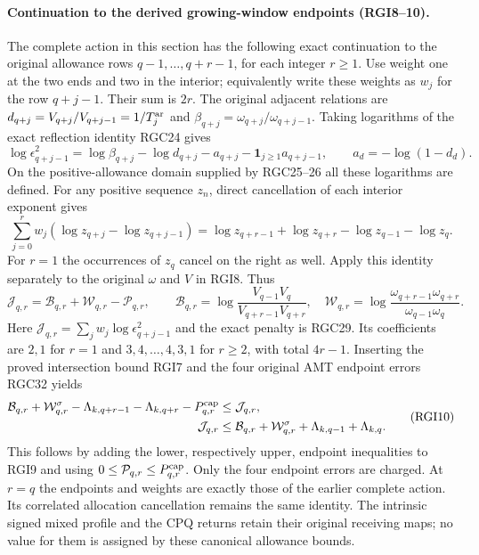 \paragraph{Continuation to the derived growing-window endpoints (RGI8--10).}
The complete action in this section has the following exact continuation to
the original allowance rows $q-1,\ldots,q+r-1$, for each integer $r\ge1$.
Use weight one at the two ends and two in the interior; equivalently write
these weights as $w_j$ for the row $q+j-1$.  Their sum is $2r$.  The original
adjacent relations are
$d_{q+j}=V_{q+j}/V_{q+j-1}=1/T_j^{\rm ar}$ and
$\beta_{q+j}=\omega_{q+j}/\omega_{q+j-1}$.  Taking logarithms of the exact
reflection identity RGC24 gives
\begin{equation}
 \log\epsilon_{q+j-1}^2
 =\log\beta_{q+j}-\log d_{q+j}-a_{q+j}
       -\boldsymbol1_{j\ge1}a_{q+j-1},\qquad
 a_d=-\log(1-d_d).
 \tag{RGI8}\label{RGI:rowaction}
\end{equation}
On the positive-allowance domain supplied by RGC25--26 all these logarithms
are defined.  For any positive sequence $z_n$, direct cancellation of each
interior exponent gives
\[
 \sum_{j=0}^{r}w_j(\log z_{q+j}-\log z_{q+j-1})
 =\log z_{q+r-1}+\log z_{q+r}-\log z_{q-1}-\log z_q.
\]
For $r=1$ the occurrences of $z_q$ cancel on the right as well.  Apply this
identity separately to the original $\omega$ and $V$ in RGI8.  Thus
\begin{equation}
 \mathcal J_{q,r}=\mathcal B_{q,r}+\mathcal W_{q,r}-\mathcal P_{q,r},
 \qquad
 \mathcal B_{q,r}=\log\frac{V_{q-1}V_q}{V_{q+r-1}V_{q+r}},\quad
 \mathcal W_{q,r}=\log\frac{\omega_{q+r-1}\omega_{q+r}}
                              {\omega_{q-1}\omega_q}.
 \tag{RGI9}\label{RGI:action}
\end{equation}
Here $\mathcal J_{q,r}=\sum_jw_j\log\epsilon_{q+j-1}^2$ and the exact penalty
is RGC29.  Its coefficients are $2,1$ for $r=1$ and
$3,4,\ldots,4,3,1$ for $r\ge2$, with total $4r-1$.
Inserting the proved intersection bound RGI7 and the four original AMT
endpoint errors RGC32 yields
\begin{equation}
 \begin{split}
 \mathcal B_{q,r}+\mathcal W^\sigma_{q,r}
 -\Lambda_{k,q+r-1}-\Lambda_{k,q+r}-P_{q,r}^{\rm cap}
 &\le\mathcal J_{q,r},\\
 \mathcal J_{q,r}
 &\le\mathcal B_{q,r}+\mathcal W^\sigma_{q,r}
           +\Lambda_{k,q-1}+\Lambda_{k,q}.
 \end{split}
 \tag{RGI10}\label{RGI:actionbounds}
\end{equation}
This follows by adding the lower, respectively upper, endpoint inequalities
to RGI9 and using $0\le\mathcal P_{q,r}\le P_{q,r}^{\rm cap}$.
Only the four endpoint errors are charged.  At $r=q$ the endpoints and
weights are exactly those of the earlier complete action.  Its correlated
allocation cancellation remains the same identity.  The intrinsic signed
mixed profile and the CPQ returns retain their original receiving maps; no
value for them is assigned by these canonical allowance bounds.


